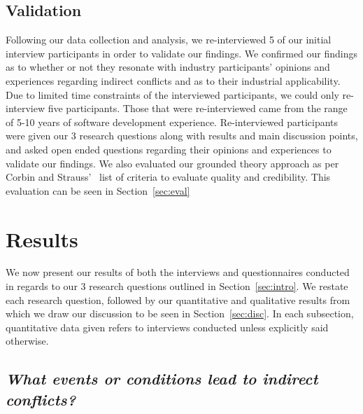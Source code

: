 \documentclass[conference]{IEEEtran}
\begin{document}
\subsection{Validation}

Following our data collection and analysis, we re-interviewed 5 of our initial interview participants
in order to validate our findings. We confirmed our findings as to whether or not they resonate with
industry participants' opinions and experiences regarding indirect conflicts and as to their industrial
applicability. Due to limited time constraints of the interviewed participants, we could only re-interview
five participants. Those that were re-interviewed came from the range of 5-10 years of software development
experience. Re-interviewed participants were given our 3 research questions along with results and main
discussion points, and asked open ended questions regarding their opinions and experiences to validate our
findings. We also evaluated our grounded theory approach as per Corbin and Strauss'~\cite{Corbin:1998:SP}
list of criteria to evaluate quality and credibility. This evaluation can be seen in Section~\ref{sec:eval}

\section{Results}
\label{sec:results}

We now present our results of both the interviews and questionnaires conducted in regards to our 3 research questions
outlined in Section~\ref{sec:intro}. We restate each research question, followed by our quantitative and qualitative
results from which we draw our discussion to be seen in Section~\ref{sec:disc}. In each subsection, quantitative data
given refers to interviews conducted unless explicitly said otherwise.

{}
\subsection*{ \it{What events or conditions lead to indirect conflicts?}}
\end{document}
